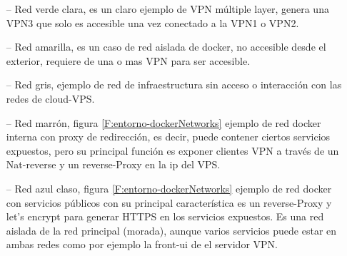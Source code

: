\begin{itemize}
    \item[--] Red verde clara, es un claro ejemplo de VPN múltiple layer, genera una VPN3 que solo es accesible una vez conectado a la VPN1 o VPN2.
     \item[--] Red amarilla, es un  caso de red aislada de docker, no accesible desde el exterior, requiere de una o mas VPN para ser accesible. 
    \item[--] Red gris, ejemplo de red de infraestructura sin acceso o interacción con las redes de cloud-VPS.
    \item[--] Red marrón, figura \ref{F:entorno-dockerNetworks} ejemplo de red docker interna con proxy de redirección, es decir, puede contener ciertos servicios expuestos, pero su principal función es exponer clientes VPN a través de un Nat-reverse y un reverse-Proxy en la ip del VPS.
    \item[--] Red azul claso, figura \ref{F:entorno-dockerNetworks} ejemplo de red docker con servicios públicos con su principal característica es un reverse-Proxy y let's encrypt para generar HTTPS en los servicios expuestos. Es una red aislada de la red principal (morada), aunque varios servicios puede estar en ambas redes como por ejemplo la front-ui de el servidor VPN.
\end{itemize}

